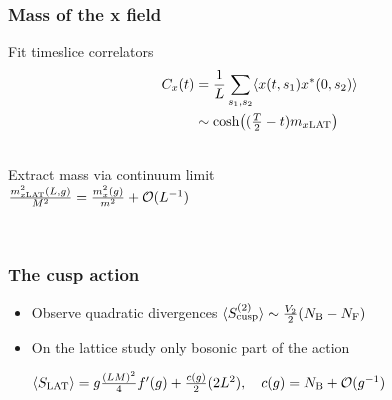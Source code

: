 \documentclass{beamer}
\begin{document}
\begin{frame}[plain]
\frametitle{Mass of the x field}
\begin{minipage}{0.5\linewidth}
\vspace{-20mm}
Fit timeslice correlators 
\begin{align*}
\huge C_{x}(t) &= \frac{1}{L}\sum\limits_{s_{1},s_{2}} \langle x(t,s_{1})x^{*}(0,s_{2})\rangle \\
&\sim {\rm cosh}\big( (\tfrac{T}{2}-t) m_{x{\rm LAT}} \big)
\end{align*}


\hfill\\
\vspace{10mm}
Extract mass via continuum limit\\
$\frac{m_{x \rm LAT}^{2}(L,g)}{M^{2}} = \frac{m_{x}^{2}(g)}{m^{2}} + \mathcal{O}(L^{-1})$
\end{minipage}
\begin{minipage}{0.45\linewidth}
\vspace{-10mm}
\\

\end{minipage}
\end{frame}


\begin{frame}[plain]
\frametitle{The cusp action}
\begin{itemize}
\item Observe quadratic divergences $\langle S_{\rm cusp}^{(2)}\rangle \sim \frac{V_{2}}{2}(N_{\rm B}-N_{\rm F})$
\item On the lattice study only bosonic part of the action\\
\begin{center}
$\langle S_{\rm LAT} \rangle = g \frac{(LM)^{2}}{4}f'(g) + \frac{c(g)}{2}(2L^{2}), \quad c(g) = N_{\rm B} +\mathcal{O}(g^{-1})$
\end{center}
\end{itemize}
\vspace{4mm}
\end{frame}
\end{document}
